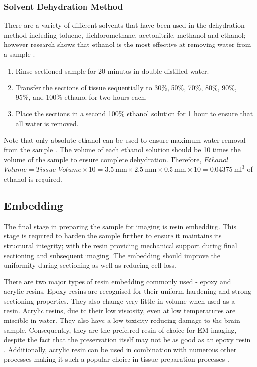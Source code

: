 \documentclass[a4paper, 11pt]{article}
\numberwithin{equation}{section}
\begin{document}
\subsubsection{Solvent Dehydration Method}

There are a variety of different solvents that have been used in the dehydration method including toluene, dichloromethane, acetonitrile, methanol and ethanol; however research shows that ethanol is the most effective at removing water from a sample \cite{jo101589}.

\begin{enumerate} 
 \item Rinse sectioned sample for 20 minutes in double distilled water.
 \item Transfer the sections of tissue sequentially to 30\%, 50\%, 70\%, 80\%, 90\%, 95\%, and 100\% ethanol for two hours each.
 \item Place the sections in a second 100\% ethanol solution for 1 hour to ensure that all water is removed.
\end{enumerate}

Note that only absolute ethanol can be used to ensure maximum water removal from the sample \cite{dehydrationmethod}. The volume of each ethanol solution should be 10 times the volume of the sample to ensure complete dehydration. Therefore, $Ethanol$ $Volume = Tissue$ $Volume \times 10 = \SI{3.5}{\milli\metre} \times \SI{2.5}{\milli\metre} \times \SI{0.5}{\milli\metre} \times 10= \SI{0.04375}{\milli\litre\cubed}$ of ethanol is required.


\subsection{Embedding}
\label{Embed}
The final stage in preparing the sample for imaging is resin embedding. This stage is required to harden the sample further to ensure it maintains its structural integrity; with the resin providing mechanical support during final sectioning and subsequent imaging. The embedding should improve the uniformity during sectioning as well as reducing cell loss. 

There are two major types of resin embedding commonly used - epoxy and acrylic resins. Epoxy resins are recognised for their uniform hardening and strong sectioning properties. They also change very little in volume when used as a resin. Acrylic resins, due to their low viscosity, even at low temperatures are miscible in water. They also have a low toxicity reducing damage to the brain sample. Consequently, they are the preferred resin of choice for EM imaging, despite the fact that the preservation itself may not be as good as an epoxy resin \cite{embeddinghistory}. Additionally, acrylic resin can be used in combination with numerous other processes making it such a popular choice in tissue preparation processes \cite{resinforem}.
\end{document}
